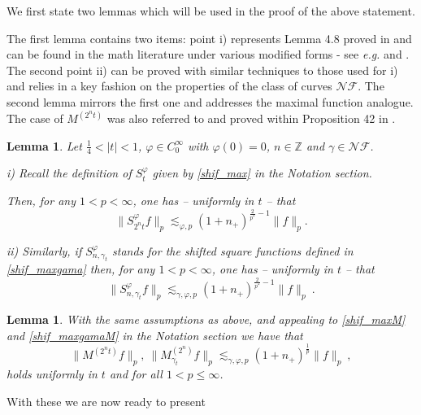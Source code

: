\documentclass{amsart}
\newcommand{\Z}{\mathbb{Z}}
\def\v{\varphi}
\newcommand{\g}{\gamma}
\newcommand{\NF}{\mathcal{NF}}
\newtheorem{lemma}[theorem]{Lemma}
\theoremstyle{definition}
\theoremstyle{remark}
\numberwithin{equation}{section}
\begin{document}
We first state two lemmas which will be used in the proof of the above statement.

The first lemma contains two items: point i) represents Lemma 4.8 proved in \cite{lie2015triangle} and can be found in the math literature under various modified forms - see \textit{e.g.} \cite{MS} and \cite{stein1993harmonic}. The second point ii) can be proved with similar techniques to those used for i) and relies in a key fashion on the properties of the class of curves $\NF$. The second lemma mirrors the first one and addresses the maximal function analogue. The case of $M^{(2^n t)}$ was also referred to and proved within Proposition 42 in \cite{lie2019unifiedap}.
\begin{lemma}\label{shifted_square_funct}
Let $\frac{1}{4} <|t|<1$, $\v\in C^\infty_0$ with $\v(0)=0$, $n\in\Z $ and $\g\in\NF$.

\noindent i) Recall the definition of $S_t^{\v}$ given by \eqref{shif_max} in the Notation section.

Then, for any $1<p<\infty$, one has -- uniformly in $t$ -- that
\[
  \|S_{2^n t}^{\v}f\|_p\lesssim_{\v,p} (1+n_{+})^{\frac{2}{p^*}-1}\|f\|_p.
\]

\noindent ii) Similarly, if $S_{n,\g_t}^{\v}$ stands for the shifted square functions defined in \eqref{shif_maxgama} then, for any $1<p<\infty$, one has -- uniformly in $t$ -- that
\begin{equation}\label{sup_displaced}
\|S_{n,\g_t}^{\v}f\|_p\lesssim_{\g,\v,p}(1+n_{+})^{\frac{2}{p^*}-1}\|f\|_p\:.
 \end{equation}
\end{lemma}



\begin{lemma}\label{shifted_max_funct}
With the same assumptions as above, and appealing to \eqref{shif_maxM} and \eqref{shif_maxgamaM} in the Notation section we have
that
\begin{equation}\label{sup_displaced}
\|M^{(2^n t)}f\|_p,\:\|M^{(2^n)}_{\g_t}f\|_p\lesssim_{\g,\v,p}(1+n_{+})^{\frac{1}{p}}\|f\|_p\:,
 \end{equation}
holds uniformly in $t$ and for all $1<p\leq\infty$.
\end{lemma}

With these we are now ready to present
\end{document}
